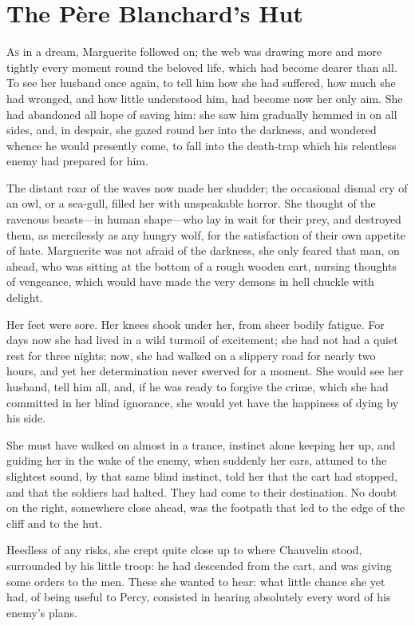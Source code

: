 
\chapter{The Père Blanchard's Hut}
\lettrine[lines=4]{A}{s} in a dream, Marguerite followed on; the web was drawing more and more tightly every moment round the beloved life, which had become dearer than all. To see her husband once again, to tell him how she had suffered, how much she had wronged, and how little understood him, had become now her only aim. She had abandoned all hope of saving him: she saw him gradually hemmed in on all sides, and, in despair, she gazed round her into the darkness, and wondered whence he would presently come, to fall into the death-trap which his relentless enemy had prepared for him.

The distant roar of the waves now made her shudder; the occasional dismal cry of an owl, or a sea-gull, filled her with unspeakable horror. She thought of the ravenous beasts—in human shape—who lay in wait for their prey, and destroyed them, as mercilessly as any hungry wolf, for the satisfaction of their own appetite of hate. Marguerite was not afraid of the darkness, she only feared that man, on ahead, who was sitting at the bottom of a rough wooden cart, nursing thoughts of vengeance, which would have made the very demons in hell chuckle with delight.

Her feet were sore. Her knees shook under her, from sheer bodily fatigue. For days now she had lived in a wild turmoil of excitement; she had not had a quiet rest for three nights; now, she had walked on a slippery road for nearly two hours, and yet her determination never swerved for a moment. She would see her husband, tell him all, and, if he was ready to forgive the crime, which she had committed in her blind ignorance, she would yet have the happiness of dying by his side.

She must have walked on almost in a trance, instinct alone keeping her up, and guiding her in the wake of the enemy, when suddenly her ears, attuned to the slightest sound, by that same blind instinct, told her that the cart had stopped, and that the soldiers had halted. They had come to their destination. No doubt on the right, somewhere close ahead, was the footpath that led to the edge of the cliff and to the hut.

Heedless of any risks, she crept quite close up to where Chauvelin stood, surrounded by his little troop: he had descended from the cart, and was giving some orders to the men. These she wanted to hear: what little chance she yet had, of being useful to Percy, consisted in hearing absolutely every word of his enemy's plans.

